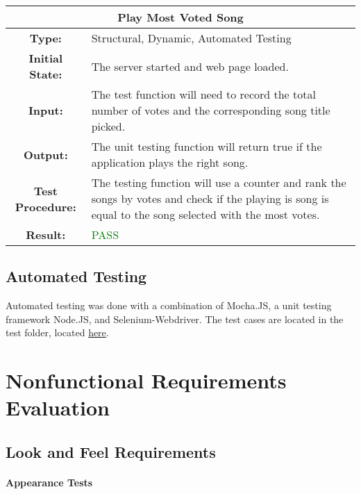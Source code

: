 \documentclass[12pt, titlepage]{article}
\begin{document}
\begin{center}
\begin{table}[H]
\begin{tabularx}{\textwidth}{| c X |}
\hline
\multicolumn{2}{|c|}{\textbf{Play Most Voted Song}}\\
\hline
\textbf{Type: } & Structural, Dynamic, Automated Testing\\


\textbf{Initial State: } & The server started and web page loaded.\\


\textbf{Input: } & The test function will need to record the total number of votes and the corresponding song title picked.\\


\textbf{Output: } & The unit testing function will return true if the application plays the right song.\\


\textbf{Test Procedure: } &The testing function will use a counter and rank the songs by votes and check if the playing is song is equal to the song selected with the most votes. \\


\textbf{Result: } & \textcolor{green}{PASS}\\
\hline
\end{tabularx}
\end{table}
\end{center}

\subsection{Automated Testing}

Automated testing was done with a combination of Mocha.JS, a unit testing framework Node.JS, and Selenium-Webdriver. The test cases are located in the test folder, located \href{https://gitlab.cas.mcmaster.ca/velechva/DJS/tree/master/src/test}{here}.



\section{Nonfunctional Requirements Evaluation}
\subsection{Look and Feel Requirements}

\paragraph{Appearance Tests}
\end{document}
